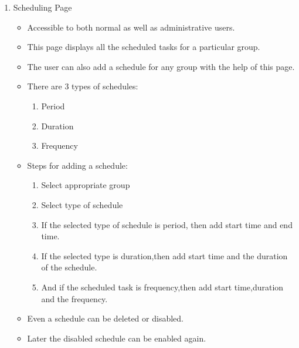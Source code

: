 \documentclass[a4paper,12pt,oneside]{book}
\begin{document}
\begin{enumerate}
\begin{itemize}
\begin{enumerate}
            \item{Scheduling Page}
            \setlength\itemsep{0.2cm}
                \begin{itemize}
                    \item{Accessible to both normal as well as administrative users.}
                    \item{This page displays all the scheduled tasks for a particular group.}
                    \item{The user can also add a schedule for any group with the help of this page.}
                    \item{There are 3 types of schedules:}
                    \setlength\itemsep{0.2cm}
                        \begin{enumerate}
                            \item{Period}
                            \item{Duration}
                            \item{Frequency}
                        \end{enumerate}
                    \item{Steps for adding a schedule: }
                    \setlength\itemsep{0.2cm}
                        \begin{enumerate}
                            \item{Select appropriate group}
                            \item{Select type of schedule}
                            \item{If the selected type of schedule is period, then add start time and end time.}
                            \item{If the selected type is duration,then add start time and the duration of the schedule.}
                            \item{And if the scheduled task is frequency,then add start time,duration and the frequency.}
                        \end{enumerate}
                    \item{Even a schedule can be deleted or disabled.}
                    \item{Later the disabled schedule can be enabled again.}
                    

\end{itemize}
\end{enumerate}
\end{itemize}
\end{enumerate}
\end{document}
